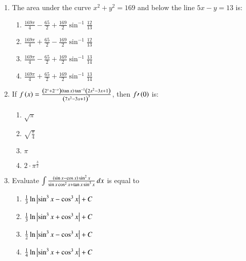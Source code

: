 \documentclass[journal,12pt,twocolumn]{IEEEtran}
\theoremstyle{remark}
\begin{document}
\begin{enumerate}[start=1]
\item The area under the curve $x^2 + y^2 = 169$ and below the line $5x - y = 13$ is:
\hfill{}
	\begin{enumerate}
    \item $\frac{169 \pi}{4} - \frac{65}{2} + \frac{169}{2} \sin^{-1} \frac{12}{13}$
    \item $\frac{169 \pi}{4} + \frac{65}{2} - \frac{169}{2} \sin^{-1} \frac{12}{13}$
    \item $\frac{169 \pi}{4} - \frac{65}{2} + \frac{169}{2} \sin^{-1} \frac{13}{14}$
    \item $\frac{169 \pi}{4} + \frac{65}{2} + \frac{169}{2} \sin^{-1} \frac{13}{14}$
\end{enumerate}
\item If $f\left(x\right) = \frac{\left(2^x +2^{-x}\right)\left(\tan x\right)\tan^{-1} \left(2x^2 - 3x + 1\right)}{\left(7x^2 - 3x +1\right)^3}$, then $f\prime\left(0\right)$ is:
\hfill{}
	\begin{enumerate}
    \item $\sqrt{\pi}$
    \item $\sqrt{\frac{\pi}{4}}$
    \item $\pi$
    \item $2\cdot\pi^\frac{3}{2}$
\end{enumerate}
\item Evaluate $\int \frac{\left(\sin x - \cos x\right) \sin^2 x}{\sin x\cos^2 x + \tan x\sin^3 x} \, dx$ is equal to
\hfill{}
	\begin{enumerate}
    \item $\frac{1}{3} \ln \left\vert\sin^3 x - \cos^3 x\right\vert + C$
    \item $\frac{1}{3} \ln \left\vert\sin^3 x + \cos^3 x\right\vert + C$
    \item $\frac{1}{2} \ln \left\vert\sin^3 x - \cos^3 x\right\vert + C$
    \item $\frac{1}{4} \ln \left\vert\sin^3 x + \cos^3 x\right\vert + C$
\end{enumerate}
\end{enumerate}
\end{document}
